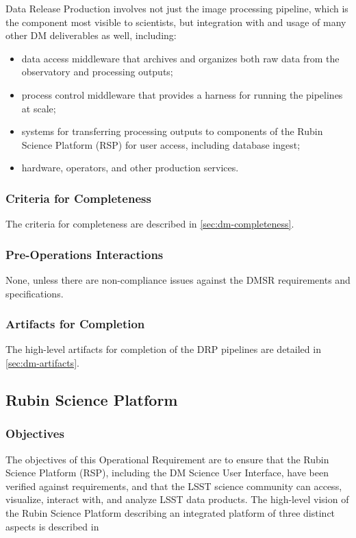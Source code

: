 Data Release Production involves not just the image processing pipeline,  which is the component most visible to scientists, but integration with and usage of many other DM deliverables as well, including:
\begin{itemize}
\item data access middleware that archives and organizes both raw data from the observatory and processing outputs;
\item process control middleware that provides a harness for running the pipelines at scale;
\item systems for transferring processing outputs to components of the Rubin Science Platform (RSP) for user access, including database ingest;
\item hardware, operators, and other production services.
\end{itemize}

\subsubsection{Criteria for Completeness}
The criteria for completeness are described in \ref{sec:dm-completeness}. 

\subsubsection{Pre-Operations Interactions}
None, unless there are non-compliance issues against the DMSR requirements and specifications.

\subsubsection{Artifacts for Completion}
The high-level artifacts for completion of the DRP pipelines are detailed in \ref{sec:dm-artifacts}.   

\subsection{Rubin Science Platform}


\subsubsection{Objectives} 
The objectives of this Operational Requirement are to ensure that the Rubin Science Platform (RSP), including the DM Science User Interface, have been verified against requirements, and that the LSST science community can access, visualize, interact with, and analyze LSST data products. 
The high-level vision of the Rubin Science Platform describing an integrated platform of three distinct aspects is described in 

